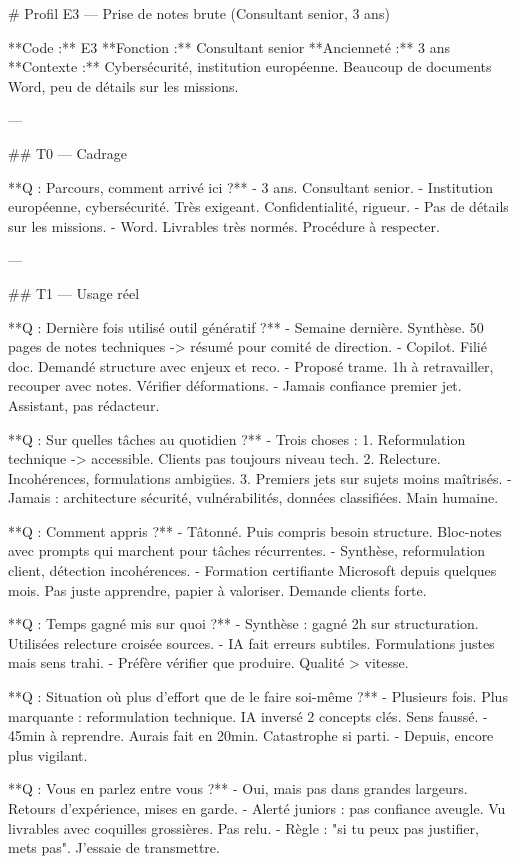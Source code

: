 # Profil E3 — Prise de notes brute (Consultant senior, 3 ans)

**Code :** E3 
**Fonction :** Consultant senior  
**Ancienneté :** 3 ans  
**Contexte :** Cybersécurité, institution européenne. Beaucoup de documents Word, peu de détails sur les missions.

---

## T0 — Cadrage

**Q : Parcours, comment arrivé ici ?**
- 3 ans. Consultant senior.
- Institution européenne, cybersécurité. Très exigeant. Confidentialité, rigueur.
- Pas de détails sur les missions.
- Word. Livrables très normés. Procédure à respecter.

---

## T1 — Usage réel

**Q : Dernière fois utilisé outil génératif ?**
- Semaine dernière. Synthèse. 50 pages de notes techniques -> résumé pour comité de direction.
- Copilot. Filié doc. Demandé structure avec enjeux et reco.
- Proposé trame. 1h à retravailler, recouper avec notes. Vérifier déformations.
- Jamais confiance premier jet. Assistant, pas rédacteur.

**Q : Sur quelles tâches au quotidien ?**
- Trois choses :
  1. Reformulation technique -> accessible. Clients pas toujours niveau tech.
  2. Relecture. Incohérences, formulations ambigües.
  3. Premiers jets sur sujets moins maîtrisés.
- Jamais : architecture sécurité, vulnérabilités, données classifiées. Main humaine.

**Q : Comment appris ?**
- Tâtonné. Puis compris besoin structure. Bloc-notes avec prompts qui marchent pour tâches récurrentes.
- Synthèse, reformulation client, détection incohérences.
- Formation certifiante Microsoft depuis quelques mois. Pas juste apprendre, papier à valoriser. Demande clients forte.

**Q : Temps gagné mis sur quoi ?**
- Synthèse : gagné 2h sur structuration. Utilisées relecture croisée sources.
- IA fait erreurs subtiles. Formulations justes mais sens trahi.
- Préfère vérifier que produire. Qualité > vitesse.

**Q : Situation où plus d'effort que de le faire soi-même ?**
- Plusieurs fois. Plus marquante : reformulation technique. IA inversé 2 concepts clés. Sens faussé.
- 45min à reprendre. Aurais fait en 20min. Catastrophe si parti.
- Depuis, encore plus vigilant.

**Q : Vous en parlez entre vous ?**
- Oui, mais pas dans grandes largeurs. Retours d'expérience, mises en garde.
- Alerté juniors : pas confiance aveugle. Vu livrables avec coquilles grossières. Pas relu.
- Règle : "si tu peux pas justifier, mets pas". J'essaie de transmettre.

